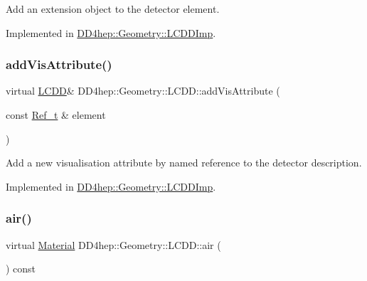 Add an extension object to the detector element. 



Implemented in \hyperlink{class_d_d4hep_1_1_geometry_1_1_l_c_d_d_imp_a6a8e772cd986a1e6211b4e3b0b1ae997}{D\+D4hep\+::\+Geometry\+::\+L\+C\+D\+D\+Imp}.

\hypertarget{class_d_d4hep_1_1_geometry_1_1_l_c_d_d_a705cc171273fe3aa63100385b1bd7191}{}\label{class_d_d4hep_1_1_geometry_1_1_l_c_d_d_a705cc171273fe3aa63100385b1bd7191} 
\subsubsection{\texorpdfstring{add\+Vis\+Attribute()}{addVisAttribute()}}
{\footnotesize\ttfamily virtual \hyperlink{class_d_d4hep_1_1_geometry_1_1_l_c_d_d}{L\+C\+DD}\& D\+D4hep\+::\+Geometry\+::\+L\+C\+D\+D\+::add\+Vis\+Attribute (\begin{DoxyParamCaption}\item[{const \hyperlink{group___d_d4_h_e_p___g_e_o_m_e_t_r_y_ga40af83be6718bb8828a3d83dc7f8c930}{Ref\+\_\+t} \&}]{element }\end{DoxyParamCaption})\hspace{0.3cm}{\ttfamily [pure virtual]}}



Add a new visualisation attribute by named reference to the detector description. 



Implemented in \hyperlink{class_d_d4hep_1_1_geometry_1_1_l_c_d_d_imp_a6b0b4c0f5d67a156215447e385820dc4}{D\+D4hep\+::\+Geometry\+::\+L\+C\+D\+D\+Imp}.

\hypertarget{class_d_d4hep_1_1_geometry_1_1_l_c_d_d_a35239d8469cba6c091e970a1baec312b}{}\label{class_d_d4hep_1_1_geometry_1_1_l_c_d_d_a35239d8469cba6c091e970a1baec312b} 
\subsubsection{\texorpdfstring{air()}{air()}}
{\footnotesize\ttfamily virtual \hyperlink{class_d_d4hep_1_1_geometry_1_1_material}{Material} D\+D4hep\+::\+Geometry\+::\+L\+C\+D\+D\+::air (\begin{DoxyParamCaption}{ }\end{DoxyParamCaption}) const\hspace{0.3cm}{\ttfamily [pure virtual]}}



